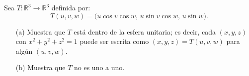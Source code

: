 \documentclass[12pt]{article}
\begin{document}
Sea \( T : \mathbb{R}^3 \to \mathbb{R}^3 \) definida por:
\[
T(u, v, w) = \big(u \cos v \cos w, \, u \sin v \cos w, \, u \sin w\big).
\]

\begin{enumerate}
    \item[(a)] Muestra que \( T \) está dentro de la esfera unitaria; es decir, cada \( (x, y, z) \) con \( x^2 + y^2 + z^2 = 1 \) puede ser escrita como \( (x, y, z) = T(u, v, w) \) para algún \( (u, v, w) \).
    \item[(b)] Muestra que \( T \) no es uno a uno.
\end{enumerate}
\end{document}
